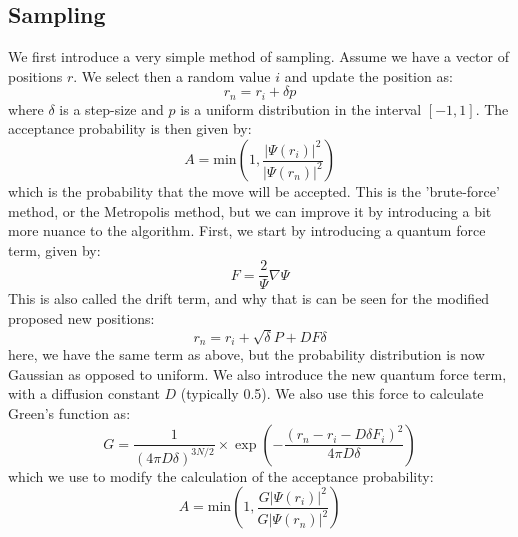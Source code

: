\documentclass[12pt]{article}
\begin{document}
{\subsection{Sampling} \label{metro}
We first introduce a very simple method of sampling. Assume we have a vector of positions $r$. We select then a random value $i$ and update the position as:
\begin{equation*}
    r_{n} = r_i + \delta p
\end{equation*}
where $\delta$ is a step-size and $p$ is a uniform distribution in the interval $[-1, 1]$. The acceptance probability is then given by:
\begin{equation*}
    A = \text{min}\left(1, \frac{|\Psi(r_i)|^2}{|\Psi(r_n)|^2}\right)
\end{equation*}
which is the probability that the move will be accepted. \newline
This is the 'brute-force' method, or the Metropolis method, but we can improve it by introducing a bit more nuance to the algorithm.
\newline
First, we start by introducing a quantum force term, given by:
\begin{equation*}
    F = \frac{2}{\Psi}\nabla \Psi
\end{equation*}
This is also called the drift term, and why that is can be seen for the modified proposed new positions:
\begin{equation*}
    r_n = r_i + \sqrt{\delta}P + D F \delta
\end{equation*}
here, we have the same term as above, but the probability distribution is now Gaussian as opposed to uniform. We also introduce the new quantum force term, with a diffusion constant $D$ (typically 0.5).
\newline
We also use this force to calculate Green's function as:
\begin{equation*}
    G = \frac{1}{(4\pi D \delta)^{3N/2}} \times \exp \left(-\frac{(r_n - r_i - D \delta F_i)^2}{4\pi D \delta}\right)
\end{equation*}
which we use to modify the calculation of the acceptance probability:
\begin{equation*}
    A = \text{min} \left( 1, \frac{G|\Psi(r_i)|^2}{G|\Psi(r_n)|^2}\right)
\end{equation*}

}
\end{document}
